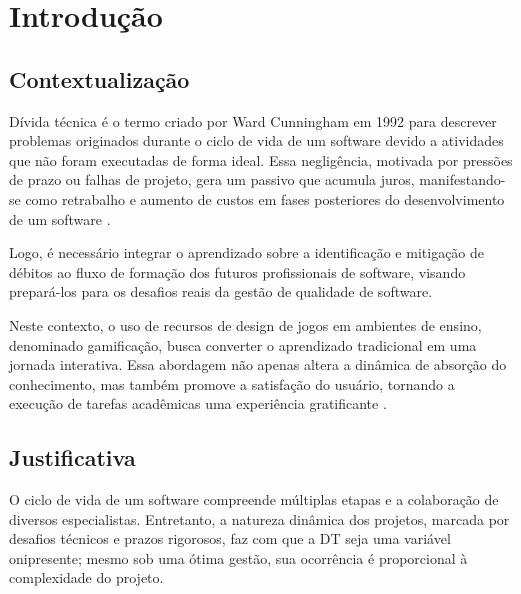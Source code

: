 \documentclass[12pt,openright,oneside,a4paper,brazil]{abntex2}
\begin{document}
\imprimircapa
\imprimirfolhaderosto

\textual


\chapter{Introdução}

\section{Contextualização}
Dívida técnica é o termo criado por Ward Cunningham em 1992 \cite{cunningham1992} para descrever problemas originados durante o ciclo de vida de um software devido a atividades que não foram executadas de forma ideal. Essa negligência, motivada por pressões de prazo ou falhas de projeto, gera um passivo que acumula juros, manifestando-se como retrabalho e aumento de custos em fases posteriores do desenvolvimento de um software \cite{RIOS2018117}.

Logo, é necessário integrar o aprendizado sobre a identificação e mitigação de débitos ao fluxo de formação dos futuros profissionais de software, visando prepará-los para os desafios reais da gestão de qualidade de software.

Neste contexto, o uso de recursos de design de jogos em ambientes de ensino, denominado gamificação, busca converter o aprendizado tradicional em uma jornada interativa. Essa abordagem não apenas altera a dinâmica de absorção do conhecimento, mas também promove a satisfação do usuário, tornando a execução de tarefas acadêmicas uma experiência gratificante \cite{Lampropoulos2024}.

\section{Justificativa}
O ciclo de vida de um software compreende múltiplas etapas e a colaboração de diversos especialistas. Entretanto, a natureza dinâmica dos projetos, marcada por desafios técnicos e prazos rigorosos, faz com que a DT seja uma variável onipresente; mesmo sob uma ótima gestão, sua ocorrência é proporcional à complexidade do projeto.
\end{document}
